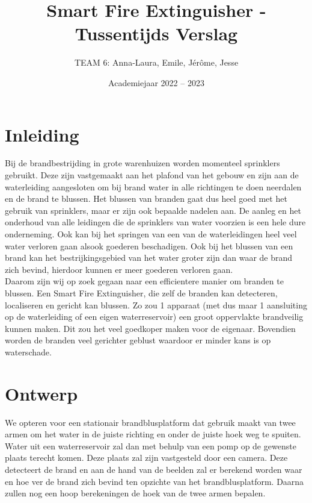 \documentclass[kulak]{kulakarticle} %
\title{Smart Fire Extinguisher - Tussentijds Verslag}
\author{TEAM 6: Anna-Laura, Emile, Jérôme, Jesse}
\date{Academiejaar 2022 -- 2023}
\begin{document}
\maketitle

\section*{Inleiding}

Bij de brandbestrijding in grote warenhuizen worden momenteel sprinklers gebruikt. Deze zijn vastgemaakt aan het plafond van het gebouw en zijn aan de waterleiding aangesloten om bij brand water in alle richtingen te doen neerdalen en de brand te blussen. Het blussen van branden gaat dus heel goed met het gebruik van sprinklers, maar er zijn ook bepaalde nadelen aan. De aanleg en het onderhoud van alle leidingen die de sprinklers van water voorzien is een hele dure onderneming. Ook kan bij het springen van een van de waterleidingen heel veel water verloren gaan alsook goederen beschadigen. Ook bij het blussen van een brand kan het bestrijkingsgebied van het water groter zijn dan waar de brand zich bevind, hierdoor kunnen er meer goederen verloren gaan. \\

Daarom zijn wij op zoek gegaan naar een efficientere manier om branden te blussen. Een Smart Fire Extinguisher, die zelf de branden kan detecteren, localiseren en gericht kan blussen. Zo zou 1 apparaat (met dus maar 1 aansluiting op de waterleiding of een eigen waterreservoir) een groot oppervlakte brandveilig kunnen maken. Dit zou het veel goedkoper maken voor de eigenaar. Bovendien worden de branden veel gerichter geblust waardoor er minder kans is op waterschade.


\section{Ontwerp}

We opteren voor een stationair brandblusplatform dat gebruik maakt van twee armen om het water in de juiste richting en onder de juiste hoek weg te spuiten. Water uit een waterreservoir zal dan met behulp van een pomp op de gewenste plaats terecht komen. Deze plaats zal zijn vastgesteld door een camera. Deze detecteert de brand en aan de hand van de beelden zal er berekend worden waar en hoe ver de brand zich bevind ten opzichte van het brandblusplatform. Daarna zullen nog een hoop berekeningen de hoek van de twee armen bepalen. \\
\end{document}
